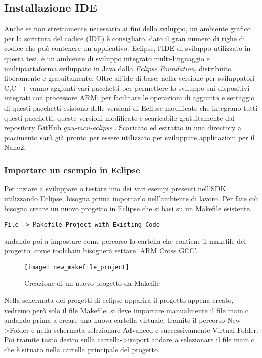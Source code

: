 \subsection{Installazione IDE}
Anche se non strettamente necessario ai fini dello sviluppo, un ambiente grafico per la scrittura del codice (IDE) è consigliato, dato il gran numero di righe di codice che può contenere un applicativo. Eclipse, l'IDE di sviluppo utilizzato in questa tesi, è un ambiente di sviluppo integrato multi-linguaggio e multipiattaforma sviluppato in Java dalla \emph{Eclipse Foundation}, distribuito liberamente e gratuitamente.
Oltre all'ide di base, nella versione per sviluppatori C,C++ vanno aggiunti vari pacchetti per permettere lo sviluppo sui dispositivi integrati con processore ARM; per facilitare le operazioni di aggiunta e settaggio di questi pacchetti esistono delle versioni di Eclipse modificate che integrano tutti questi pacchetti; queste versioni modificate è scaricabile gratuitamente dal repository GitHub \emph{gnu-mcu-eclipse} \cite{gnueclipseweb}. Scaricato ed estratto in una directory a piacimento sarà già pronto per essere utilizzato per sviluppare applicazioni per il Nano2.
\subsubsection{Importare un esempio in Eclipse}
Per inziare a sviluppare o testare uno dei vari esempi presenti nell'SDK utilizzando Eclipse, bisogna prima importarlo nell'ambiente di lavoro. 
Per fare ciò bisogna creare un nuovo progetto in Eclipse che si basi su un Makefile esistente.

\begin{verbatim}
File -> Makefile Project with Existing Code
\end{verbatim}
andando poi a impostare come percorso la cartella che contiene il makefile del progetto; come toolchain bisognerà settare \lq ARM Cross GCC\rq .

\begin{figure}[H]
\texttt{[image: new\_makefile\_project]}
\centering
\caption{Creazione di un nuovo progetto da Makefile}
\label{makefile_proj}
\end{figure}

Nella schermata dei progetti di eclipse apparirà il progetto appena creato, vedremo però solo il file Makefile; si deve importare manualmente il file main.c andando prima a creare una nuova cartella virtuale, tramite il percorso \mbox{New-\textgreater  Folder} e nella schermata selezionare Advanced e successivamente Virtual Folder. Poi tramite tasto destro sulla \mbox{cartella-\textgreater  import} andare a selezionare il file main.c che è situato nella cartella principale del progetto.

